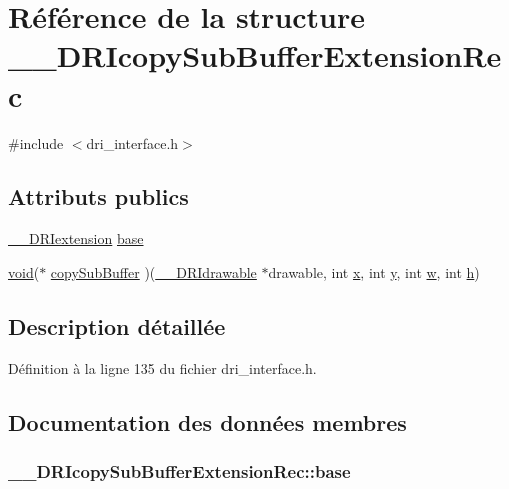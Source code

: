 \hypertarget{struct_____d_r_icopy_sub_buffer_extension_rec}{\section{Référence de la structure \-\_\-\-\_\-\-D\-R\-Icopy\-Sub\-Buffer\-Extension\-Rec}
\label{struct_____d_r_icopy_sub_buffer_extension_rec}
}


{\ttfamily \#include $<$dri\-\_\-interface.\-h$>$}

\subsection*{Attributs publics}
\begin{DoxyCompactItemize}
\item 
\hyperlink{dri__interface_8h_a4e0a61c8ece00d2b2c6792a9a1b55385}{\-\_\-\-\_\-\-D\-R\-Iextension} \hyperlink{struct_____d_r_icopy_sub_buffer_extension_rec_af6b56a9cba33f5cc35a9a6c7a559213b}{base}
\item 
\hyperlink{glu_8h_a4292190e3f1f6b373a760c7d9316ad3c}{void}($\ast$ \hyperlink{struct_____d_r_icopy_sub_buffer_extension_rec_a0be1cfdf2996b714472ffb0cb5422248}{copy\-Sub\-Buffer} )(\hyperlink{dri__interface_8h_a5bfb832a0a08208d95b3bbef439d2262}{\-\_\-\-\_\-\-D\-R\-Idrawable} $\ast$drawable, int \hyperlink{gl_8h_a0cdec8e97a75ee9458b23d152bf962d4}{x}, int \hyperlink{gl_8h_a74d80fd479c0f6d0153c709949a089ef}{y}, int \hyperlink{glext_8h_adb12a0d439f32ca388b2c806150cc54d}{w}, int \hyperlink{glext_8h_afa0fb1b5e976920c0abeff2dca3ed774}{h})
\end{DoxyCompactItemize}


\subsection{Description détaillée}


Définition à la ligne 135 du fichier dri\-\_\-interface.\-h.



\subsection{Documentation des données membres}
\hypertarget{struct_____d_r_icopy_sub_buffer_extension_rec_af6b56a9cba33f5cc35a9a6c7a559213b}{
\subsubsection[{base}]{ \-\_\-\-\_\-\-D\-R\-Icopy\-Sub\-Buffer\-Extension\-Rec\-::base}}\label{struct_____d_r_icopy_sub_buffer_extension_rec_af6b56a9cba33f5cc35a9a6c7a559213b}


